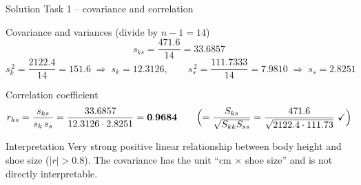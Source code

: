 \documentclass[aspectratio=169,11pt]{beamer}
\begin{document}
\begin{frame}{Solution Task 1 -- covariance and correlation}
  \begin{block}{Covariance and variances (divide by $n-1=14$)}
    \[
      s_{ks} = \frac{471.6}{14} = \mathbf{33.6857}
    \]
    \[
      s_k^{\,2} = \frac{2122.4}{14} = 151.6 \;\Rightarrow\; s_k = 12.3126,
      \qquad
      s_s^{\,2} = \frac{111.7333}{14} = 7.9810 \;\Rightarrow\; s_s = 2.8251
    \]
  \end{block}

  \begin{exampleblock}{Correlation coefficient}
    \[
      r_{ks} = \frac{s_{ks}}{s_k\,s_s}
        = \frac{33.6857}{12.3126 \cdot 2.8251}
        = \mathbf{0.9684}
      \qquad\Bigl(=\frac{S_{ks}}{\sqrt{S_{kk}S_{ss}}}=\frac{471.6}{\sqrt{2122.4\cdot111.73}}\ \checkmark\Bigr)
    \]
  \end{exampleblock}

  \begin{alertblock}{Interpretation}
    Very strong positive linear relationship between body height and shoe
    size ($|r|>0.8$). The covariance has the unit ``cm $\times$ shoe size'' and
    is not directly interpretable.
  \end{alertblock}
\end{frame}
\end{document}
